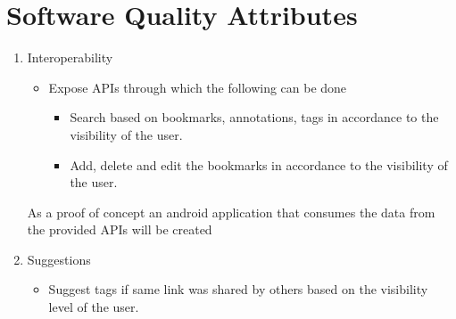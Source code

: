 \documentclass[11pt]{report} %
\begin{document}
\section{Software Quality Attributes}
\begin{enumerate}
\item
Interoperability
\begin{itemize}
\item
Expose APIs through which the following can be done
\begin{itemize}
\item
Search based on bookmarks, annotations, tags in accordance to the visibility of the user.
\item
Add, delete and edit the bookmarks in accordance to the visibility of the user.

\end{itemize}
\end{itemize}
As a proof of concept an android application that consumes the data from the provided APIs will be created
\item
Suggestions
\begin{itemize}
\item
Suggest tags if same link was shared by others based on the visibility level of the user.
\end{itemize}
\end{enumerate}
\end{document}
